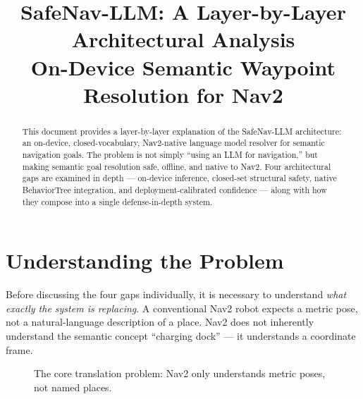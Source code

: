 \documentclass[11pt,a4paper]{article}
\title{\vspace{-1.5cm}\textbf{SafeNav-LLM: A Layer-by-Layer Architectural Analysis}\\[0.3em]
\large On-Device Semantic Waypoint Resolution for Nav2}
\author{}
\date{}
\begin{document}
\maketitle
\thispagestyle{fancy}

\begin{abstract}
\noindent This document provides a layer-by-layer explanation of the SafeNav-LLM
architecture: an on-device, closed-vocabulary, Nav2-native language model
resolver for semantic navigation goals. The problem is not simply ``using an
LLM for navigation,'' but making semantic goal resolution safe, offline, and
native to Nav2. Four architectural gaps are examined in depth --- on-device
inference, closed-set structural safety, native BehaviorTree integration, and
deployment-calibrated confidence --- along with how they compose into a single
defense-in-depth system.
\end{abstract}

\tableofcontents
\newpage

\section{Understanding the Problem}
\label{sec:problem}

Before discussing the four gaps individually, it is necessary to understand
\emph{what exactly the system is replacing}. A conventional Nav2 robot expects
a metric pose, not a natural-language description of a place. Nav2 does not
inherently understand the semantic concept ``charging dock'' --- it understands
a coordinate frame.

\begin{figure}[h]
\centering
{}
\caption{The core translation problem: Nav2 only understands metric poses, not named places.}
\end{figure}
\end{document}
